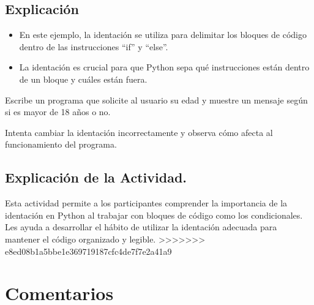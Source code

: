 \documentclass[
  a4paper,
  onepage,
  openany]{scrreprt}
\providecommand{\tightlist}{%
  \setlength{\itemsep}{0pt}\setlength{\parskip}{0pt}}\usepackage{longtable,booktabs,array}
\begin{document}
\hypertarget{explicaciuxf3n-7}{%
\section{Explicación}\label{explicaciuxf3n-7}}

\begin{itemize}
\tightlist
\item
  En este ejemplo, la identación se utiliza para delimitar los bloques
  de código dentro de las instrucciones ``if'' y ``else''.
\item
  La identación es crucial para que Python sepa qué instrucciones están
  dentro de un bloque y cuáles están fuera.
\end{itemize}

\begin{tcolorbox}[enhanced jigsaw, breakable, opacityback=0, toptitle=1mm, coltitle=black, toprule=.15mm, rightrule=.15mm, colframe=quarto-callout-important-color-frame, opacitybacktitle=0.6, arc=.35mm, title=\textcolor{quarto-callout-important-color}{\faExclamation}\hspace{0.5em}{Actividad Práctica:}, titlerule=0mm, colbacktitle=quarto-callout-important-color!10!white, bottomtitle=1mm, bottomrule=.15mm, colback=white, left=2mm, leftrule=.75mm]

Escribe un programa que solicite al usuario su edad y muestre un mensaje
según si es mayor de 18 años o no.

Intenta cambiar la identación incorrectamente y observa cómo afecta al
funcionamiento del programa.

\end{tcolorbox}

\hypertarget{explicaciuxf3n-de-la-actividad.-1}{%
\section{Explicación de la
Actividad.}\label{explicaciuxf3n-de-la-actividad.-1}}

Esta actividad permite a los participantes comprender la importancia de
la identación en Python al trabajar con bloques de código como los
condicionales. Les ayuda a desarrollar el hábito de utilizar la
identación adecuada para mantener el código organizado y legible.
\textgreater\textgreater\textgreater\textgreater\textgreater\textgreater\textgreater{}
e8ed08b1a5bbe1e369719187cfc4de7f7e2a41a9

\hypertarget{comentarios}{%
\chapter{Comentarios}\label{comentarios}}
\end{document}
